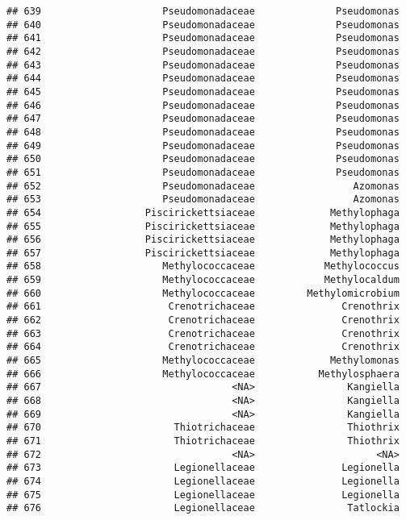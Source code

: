 \documentclass[
]{article}
\begin{document}
\begin{verbatim}
## 639                     Pseudomonadaceae              Pseudomonas
## 640                     Pseudomonadaceae              Pseudomonas
## 641                     Pseudomonadaceae              Pseudomonas
## 642                     Pseudomonadaceae              Pseudomonas
## 643                     Pseudomonadaceae              Pseudomonas
## 644                     Pseudomonadaceae              Pseudomonas
## 645                     Pseudomonadaceae              Pseudomonas
## 646                     Pseudomonadaceae              Pseudomonas
## 647                     Pseudomonadaceae              Pseudomonas
## 648                     Pseudomonadaceae              Pseudomonas
## 649                     Pseudomonadaceae              Pseudomonas
## 650                     Pseudomonadaceae              Pseudomonas
## 651                     Pseudomonadaceae              Pseudomonas
## 652                     Pseudomonadaceae                 Azomonas
## 653                     Pseudomonadaceae                 Azomonas
## 654                  Piscirickettsiaceae             Methylophaga
## 655                  Piscirickettsiaceae             Methylophaga
## 656                  Piscirickettsiaceae             Methylophaga
## 657                  Piscirickettsiaceae             Methylophaga
## 658                     Methylococcaceae            Methylococcus
## 659                     Methylococcaceae            Methylocaldum
## 660                     Methylococcaceae         Methylomicrobium
## 661                      Crenotrichaceae               Crenothrix
## 662                      Crenotrichaceae               Crenothrix
## 663                      Crenotrichaceae               Crenothrix
## 664                      Crenotrichaceae               Crenothrix
## 665                     Methylococcaceae             Methylomonas
## 666                     Methylococcaceae           Methylosphaera
## 667                                 <NA>                Kangiella
## 668                                 <NA>                Kangiella
## 669                                 <NA>                Kangiella
## 670                       Thiotrichaceae                Thiothrix
## 671                       Thiotrichaceae                Thiothrix
## 672                                 <NA>                     <NA>
## 673                       Legionellaceae               Legionella
## 674                       Legionellaceae               Legionella
## 675                       Legionellaceae               Legionella
## 676                       Legionellaceae                Tatlockia

\end{verbatim}
\end{document}

